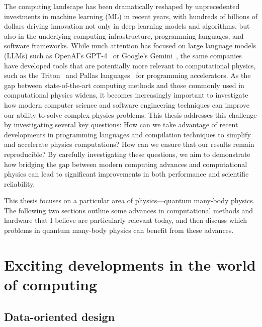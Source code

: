 The computing landscape has been dramatically reshaped by unprecedented investments in machine learning (ML) in recent years, with hundreds of billions of dollars driving innovation not only in deep learning models and algorithms, but also in the underlying computing infrastructure, programming languages, and software frameworks. While much attention has focused on large language models (LLMs) such as OpenAI's GPT-4~\cite{OpenAI_2023_GPT_4_Technical} or Google's Gemini~\cite{Team_2023_Gemini_A_Famil}, the same companies have developed tools that are potentially more relevant to computational physics, such as the Triton~\cite{Tillet_2019_Triton_an_inte} and Pallas languages~ for programming accelerators. As the gap between state-of-the-art computing methods and those commonly used in computational physics widens, it becomes increasingly important to investigate how modern computer science and software engineering techniques can improve our ability to solve complex physics problems. This thesis addresses this challenge by investigating several key questions: How can we take advantage of recent developments in programming languages and compilation techniques to simplify and accelerate physics computations? How can we ensure that our results remain reproducible? By carefully investigating these questions, we aim to demonstrate how bridging the gap between modern computing advances and computational physics can lead to significant improvements in both performance and scientific reliability.

This thesis focuses on a particular area of physics---quantum many-body physics. The following two sections outline some advances in computational methods and hardware that I believe are particularly relevant today, and then discuss which problems in quantum many-body physics can benefit from these advances.

\section{Exciting developments in the world of computing}

\subsection{Data-oriented design}\label{sec:intro:data-oriented}


